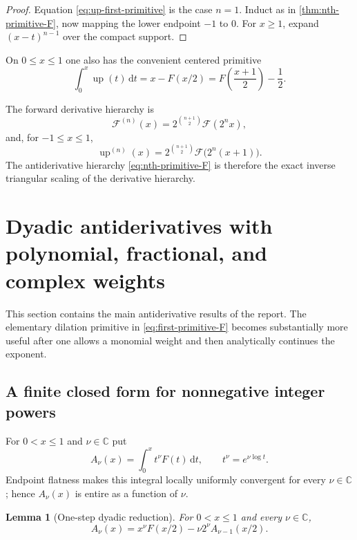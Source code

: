 \documentclass[11pt,oneside]{article}
\newtheorem{lemma}[theorem]{Lemma}
\theoremstyle{definition}
\theoremstyle{remark}
\newcommand{\C}{\mathbb C}
\newcommand{\dd}{\,\mathrm d}
\newcommand{\upf}{\operatorname{up}}
\begin{document}
\begin{proof}
Equation \eqref{eq:up-first-primitive} is the case $n=1$.  Induct as in \cref{thm:nth-primitive-F}, now mapping the lower endpoint $-1$ to $0$.  For $x\ge1$, expand $(x-t)^{n-1}$ over the compact support.
\end{proof}

On $0\le x\le1$ one also has the convenient centered primitive
\begin{equation}\label{eq:local-up-primitive}
 \int_0^x\upf(t)\dd t
 =x-F(x/2)
 =F\!\left(\frac{x+1}{2}\right)-\frac12.
\end{equation}

The forward derivative hierarchy is
\begin{equation}\label{eq:forward-derivative-hierarchy}
 \mathcal F^{(n)}(x)=2^{\binom{n+1}{2}}\mathcal F(2^nx),
\end{equation}
and, for $-1\le x\le1$,
\begin{equation}\label{eq:up-derivative-hierarchy}
 \upf^{(n)}(x)=2^{\binom{n+1}{2}}
 \mathcal F\bigl(2^n(x+1)\bigr).
\end{equation}
The antiderivative hierarchy \eqref{eq:nth-primitive-F} is therefore the exact inverse triangular scaling of the derivative hierarchy.

\section{Dyadic antiderivatives with polynomial, fractional, and complex weights}

This section contains the main antiderivative results of the report.  The elementary dilation primitive in \cref{eq:first-primitive-F} becomes substantially more useful after one allows a monomial weight and then analytically continues the exponent.

\subsection{A finite closed form for nonnegative integer powers}

For $0<x\le1$ and $\nu\in\C$ put
\begin{equation}\label{eq:A-nu-def}
 A_\nu(x)=\int_0^x t^\nu F(t)\dd t,
 \qquad t^\nu=e^{\nu\log t}.
\end{equation}
Endpoint flatness makes this integral locally uniformly convergent for every $\nu\in\C$; hence $A_\nu(x)$ is entire as a function of $\nu$.

\begin{lemma}[One-step dyadic reduction]\label{lem:A-recurrence}
For $0<x\le1$ and every $\nu\in\C$,
\begin{equation}\label{eq:A-recurrence}
 A_\nu(x)=x^\nu F(x/2)-\nu 2^\nu A_{\nu-1}(x/2).
\end{equation}
\end{lemma}
\end{document}
